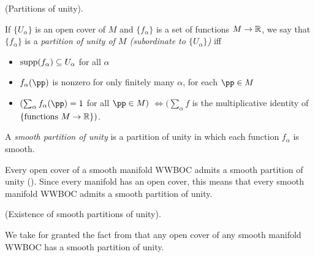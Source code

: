 \begin{defn}
     (Partitions of unity).
    
    If $\{U_\alpha\}$ is an open cover of $M$ and  $\{f_\alpha\}$ is a set of functions $M \rightarrow \mathbb{R}$, we say that $\{f_\alpha\}$ is a \textit{partition of unity of $M$ (subordinate to $\{U_\alpha\}$)} iff
    
    \begin{itemize}
        \item $\text{supp}(f_\alpha) \subseteq U_\alpha$ for all $\alpha$
        \item $f_\alpha(\pp)$ is nonzero for only finitely many $\alpha$, for each $\pp \in M$
        \item $(\sum_\alpha f_\alpha(\pp) = 1$ for all $\pp \in M)$ $\iff (\sum_\alpha f$ is the multiplicative identity of $\{\text{functions } M \rightarrow \mathbb{R}\})$.
    \end{itemize}
    
    A \textit{smooth partition of unity} is a partition of unity in which each function $f_\alpha$ is smooth.
    
    Every open cover of a smooth manifold WWBOC admits a smooth partition of unity (\cite[p. 43]{book::SM}). Since every manifold has an open cover, this means that every smooth manifold WWBOC admits a smooth partition of unity.
\end{defn}

\begin{theorem}
     (Existence of smooth partitions of unity).
    
    We take for granted the fact from \cite{book::SM} that any open cover of any smooth manifold WWBOC has a smooth partition of unity.
\end{theorem}

